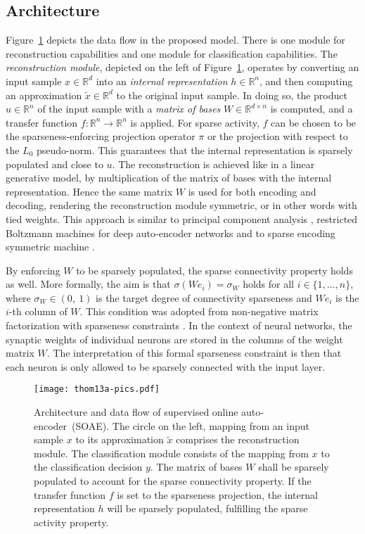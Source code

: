 \documentclass[twoside,11pt]{article}
\newcommand{\intervaloo}[2]{\left(#1,\ #2\right)}
\newcommand{\R}{\mathbb{R}}
\newcommand{\0}{\mathcal{O}}
\newcommand{\discint}[2]{\{#1,\dotsc,#2\}}
\newcommand{\inint}[2]{\in\discint{#1}{#2}}
\begin{document}
\subsection{Architecture}
Figure~\ref{fig:soae_architecture} depicts the data flow in the proposed model.
There is one module for reconstruction capabilities and one module for classification capabilities.
The \emph{reconstruction module}, depicted on the left of Figure~\ref{fig:soae_architecture}, operates by converting an input sample $x\in\R^d$ into an \emph{internal representation} $h\in\R^n$, and then computing an approximation $\tilde{x}\in\R^d$ to the original input sample.
In doing so, the product $u\in\R^n$ of the input sample with a \emph{matrix of bases} $W\in\R^{d\times n}$ is computed, and a transfer function $f\colon\R^n\to\R^n$ is applied.
For sparse activity, $f$ can be chosen to be the sparseness-enforcing projection operator $\pi$ or the projection with respect to the $L_0$ pseudo-norm.
This guarantees that the internal representation is sparsely populated and close to $u$.
The reconstruction is achieved like in a linear generative model, by multiplication of the matrix of bases with the internal representation.
Hence the same matrix $W$ is used for both encoding and decoding, rendering the reconstruction module symmetric, or in other words with tied weights.
This approach is similar to principal component analysis \citep{Hotelling1933}, restricted Boltzmann machines for deep auto-encoder networks \citep{Hinton2006} and to sparse encoding symmetric machine \citep{Ranzato2008}.

By enforcing $W$ to be sparsely populated, the sparse connectivity property holds as well.
More formally, the aim is that $\sigma(We_i) = \sigma_W$ holds for all $i\inint{1}{n}$, where $\sigma_W\in\intervaloo{0}{1}$ is the target degree of connectivity sparseness and $We_i$ is the $i$-th column of $W$.
This condition was adopted from non-negative matrix factorization with sparseness constraints \citep{Hoyer2004}.
In the context of neural networks, the synaptic weights of individual neurons are stored in the columns of the weight matrix $W$.
The interpretation of this formal sparseness constraint is then that each neuron is only allowed to be sparsely connected with the input layer.

\begin{figure}[t]
  \centering
  \texttt{[image: thom13a-pics.pdf]}
  \caption{Architecture and data flow of supervised online auto-encoder~(SOAE). The circle on the left, mapping from an input sample $x$ to its approximation $\tilde{x}$ comprises the reconstruction module. The classification module consists of the mapping from $x$ to the classification decision $y$. The matrix of bases $W$ shall be sparsely populated to account for the sparse connectivity property. If the transfer function $f$ is set to the sparseness projection, the internal representation $h$ will be sparsely populated, fulfilling the sparse activity property.}
  \label{fig:soae_architecture}
\end{figure}
\end{document}
